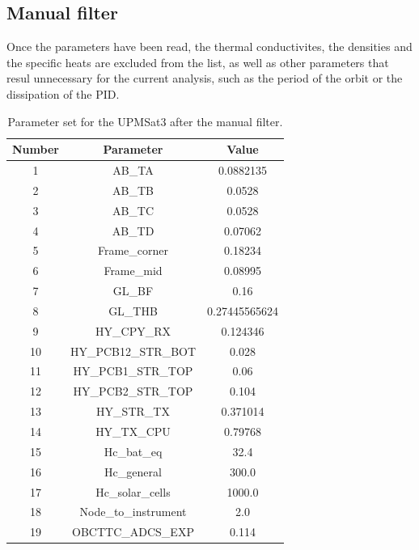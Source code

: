 \subsection{Manual filter}
Once the parameters have been read, the thermal conductivites, the densities and the specific heats are excluded from the list, as well as other parameters that resul unnecessary for the current analysis, such as the period of the orbit or the dissipation of the PID.
    \begin{table}[H]
        \centering
        \caption{Parameter set for the UPMSat3 after the manual filter.}
        \label{tab:manualfilterparamsUPMSat3}
    \begin{tabular}{ccc}
        \hline
        Number & Parameter & Value \\
        \hline
        1 & AB\_TA & 0.0882135 \\
        2 & AB\_TB & 0.0528 \\
        3 & AB\_TC & 0.0528 \\
        4 & AB\_TD & 0.07062 \\
        5 & Frame\_corner & 0.18234 \\
        6 & Frame\_mid & 0.08995 \\
        7 & GL\_BF & 0.16 \\
        8 & GL\_THB & 0.27445565624 \\
        9 & HY\_CPY\_RX & 0.124346 \\
        10 & HY\_PCB12\_STR\_BOT & 0.028 \\
        11 & HY\_PCB1\_STR\_TOP & 0.06 \\
        12 & HY\_PCB2\_STR\_TOP & 0.104 \\
        13 & HY\_STR\_TX & 0.371014 \\
        14 & HY\_TX\_CPU & 0.79768 \\
        15 & Hc\_bat\_eq & 32.4 \\
        16 & Hc\_general & 300.0 \\
        17 & Hc\_solar\_cells & 1000.0 \\
        18 & Node\_to\_instrument & 2.0 \\
        19 & OBCTTC\_ADCS\_EXP & 0.114 \\  
        \bottomrule
        \end{tabular}
    \end{table}


